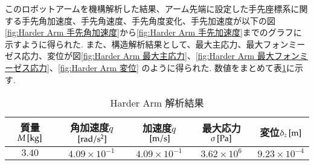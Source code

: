 \documentclass[10pt,b5paper,papersize,dvipdfmx]{jsbook}
\begin{document}
このロボットアームを機構解析した結果、アーム先端に設定した手先座標系に関する手先角加速度、手先角速度、手先角度変化、手先加速度が以下の図\ref{fig:Harder Arm 手先角加速度}から\ref{fig:Harder Arm 手先加速度}までのグラフに示すように得られた. また、構造解析結果として、最大主応力、最大フォンミーゼス応力、変位が図\ref{fig:Harder Arm 最大主応力}、\ref{fig:Harder Arm 最大フォンミーゼス応力}、\ref{fig:Harder Arm 変位} のように得られた. 数値をまとめて表\ref{tbl:Harder Arm 解析結果}に示す.
\begin{table}[htbp]
  \centering
  \caption{Harder Arm 解析結果}
  \label{tbl:Harder Arm 解析結果}
  \begin{tabular}{|c|c|c|c|c|} \hline
    質量$M\tani*{kg}$& 角加速度$\ddot{q}$$\tani*{rad/s^2}$& 加速度$\dot{q}$$\tani*{m/s}$& 最大応力$\sigma\tani*{Pa}$& 変位$\delta_z\tani*{m}$\\ \hline
    $3.40$&$4.09\times 10^{-1}$&$4.09\times 10^{-1}$&$3.62\times 10^6$&$9.23\times 10^{-4}$\\ \hline
  \end{tabular}
\end{table}
\end{document}
